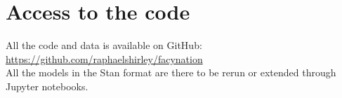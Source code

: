 \documentclass[12pt]{iopart}
\begin{document}



\appendix


\section{Access to the code}
\label{sec:model_descrip_appendix}

All the code and data is available on GitHub:\\

\url{https://github.com/raphaelshirley/facynation}\\ 

All the models in the Stan format are there to be rerun or extended through Jupyter notebooks. 





\bsp	%
\label{lastpage}
\end{document}
